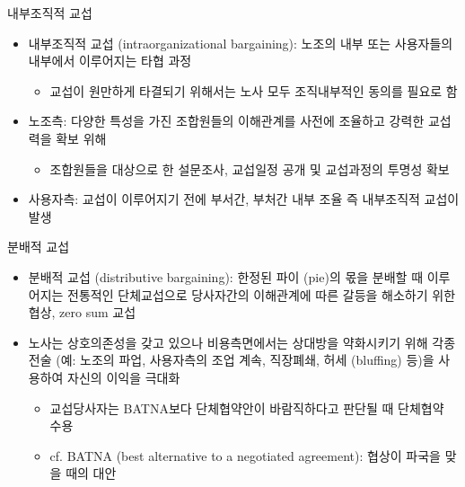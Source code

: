 \documentclass[aspectratio=169,xcolor=dvipsnames,handout]{beamer}
\begin{document}
\begin{frame}{내부조직적 교섭}
    \begin{itemize}[<+->]
        \item 내부조직적 교섭 (intraorganizational bargaining): 노조의 내부 또는 사용자들의 내부에서 이루어지는 타협 과정
        \begin{itemize}[<+->]
            \item 교섭이 원만하게 타결되기 위해서는 노사 모두 조직내부적인 동의를 필요로 함 
        \end{itemize}
    \item 노조측: 다양한 특성을 가진 조합원들의 이해관계를 사전에 조율하고 강력한 교섭력을 확보 위해
        \begin{itemize}[<+->]
            \item 조합원들을 대상으로 한 설문조사, 교섭일정 공개 및 교섭과정의 투명성 확보 
        \end{itemize}
    \item 사용자측: 교섭이 이루어지기 전에 부서간, 부처간 내부 조율 즉 내부조직적 교섭이 발생
    \end{itemize}
\end{frame}

\begin{frame}{분배적 교섭}
    \begin{itemize}[<+->]
        \item 분배적 교섭 (distributive bargaining): 한정된 파이 (pie)의 몫을 분배할 때 이루어지는 전통적인 단체교섭으로 당사자간의 이해관계에 따른 갈등을 해소하기 위한 협상, zero sum 교섭
        \item 노사는 상호의존성을 갖고 있으나 비용측면에서는 상대방을 약화시키기 위해 각종 전술 (예: 노조의 파업, 사용자측의 조업 계속, 직장폐쇄, 허세 (bluffing) 등)을 사용하여 자신의 이익을 극대화
        \begin{itemize}[<+->]
            \item 교섭당사자는 BATNA보다 단체협약안이 바람직하다고 판단될 때 단체협약 수용
            \item cf. BATNA (best alternative to a negotiated agreement): 협상이 파국을 맞을 때의 대안
        \end{itemize}
    \end{itemize}
\end{frame}
\end{document}

